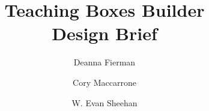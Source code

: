\documentclass[11pt,letter]{article}
\title{Teaching Boxes Builder \\ Design Brief}
\author{Deanna Fierman \and Cory Maccarrone \and W. Evan Sheehan}
\begin{document}
\begin{titlepage}
	\maketitle
	\thispagestyle{empty}
\end{titlepage}

\hfill
\thispagestyle{empty}
\pagebreak
\setcounter{page}{0}
\end{document}
